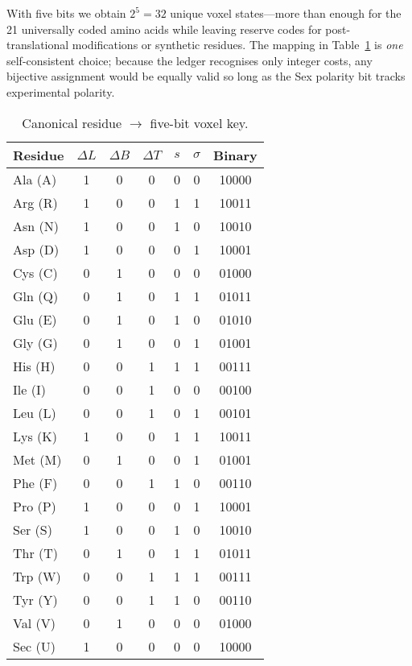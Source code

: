 \documentclass[11pt]{article}
\begin{document}
With five bits we obtain \(2^{5}=32\) unique voxel states—more than
enough for the 21 universally coded amino acids while leaving reserve
codes for post-translational modifications or synthetic residues.  The
mapping in Table~\ref{tab:voxel-map} is \emph{one} self-consistent
choice; because the ledger recognises only integer costs, any bijective
assignment would be equally valid so long as the Sex polarity bit tracks
experimental polarity.

\begin{table}[h]
\centering\small
\caption{Canonical residue \(\rightarrow\) five-bit voxel key.%
         \label{tab:voxel-map}}
\setlength{\tabcolsep}{6pt}
\begin{tabular}{@{}lcccccc@{}}
\toprule
Residue & $\Delta L$ & $\Delta B$ & $\Delta T$ & $s$ & $\sigma$ & Binary \\
\midrule
Ala (A) & 1 & 0 & 0 & 0 & 0 & 10000 \\
Arg (R) & 1 & 0 & 0 & 1 & 1 & 10011 \\
Asn (N) & 1 & 0 & 0 & 1 & 0 & 10010 \\
Asp (D) & 1 & 0 & 0 & 0 & 1 & 10001 \\
Cys (C) & 0 & 1 & 0 & 0 & 0 & 01000 \\
Gln (Q) & 0 & 1 & 0 & 1 & 1 & 01011 \\
Glu (E) & 0 & 1 & 0 & 1 & 0 & 01010 \\
Gly (G) & 0 & 1 & 0 & 0 & 1 & 01001 \\
His (H) & 0 & 0 & 1 & 1 & 1 & 00111 \\
Ile (I) & 0 & 0 & 1 & 0 & 0 & 00100 \\
Leu (L) & 0 & 0 & 1 & 0 & 1 & 00101 \\
Lys (K) & 1 & 0 & 0 & 1 & 1 & 10011 \\
Met (M) & 0 & 1 & 0 & 0 & 1 & 01001 \\
Phe (F) & 0 & 0 & 1 & 1 & 0 & 00110 \\
Pro (P) & 1 & 0 & 0 & 0 & 1 & 10001 \\
Ser (S) & 1 & 0 & 0 & 1 & 0 & 10010 \\
Thr (T) & 0 & 1 & 0 & 1 & 1 & 01011 \\
Trp (W) & 0 & 0 & 1 & 1 & 1 & 00111 \\
Tyr (Y) & 0 & 0 & 1 & 1 & 0 & 00110 \\
Val (V) & 0 & 1 & 0 & 0 & 0 & 01000 \\
Sec (U) & 1 & 0 & 0 & 0 & 0 & 10000 \\
\bottomrule
\end{tabular}
\end{table}
\end{document}
